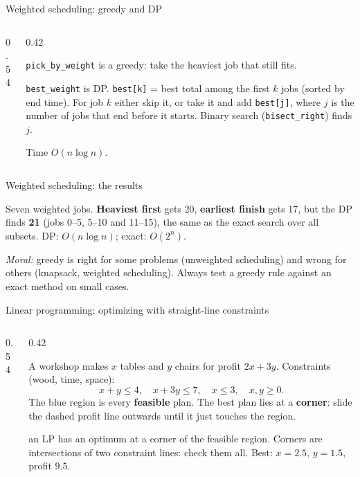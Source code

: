 \documentclass[aspectratio=169,10pt]{beamer}
\newcommand{\figtab}[2][0.5]{\begin{sfig}[#1]\end{sfig}}
\begin{document}
\begin{frame}{Weighted scheduling: greedy and DP}
\begin{columns}[T]
\begin{column}{0.54\textwidth}
\pycode[\fontsize{7.8}{9.2}\selectfont]{act_weight}
\vspace{2mm}
\pycode[\fontsize{7.8}{9.2}\selectfont]{act_dp}
\end{column}
\begin{column}{0.42\textwidth}
{\small
\texttt{pick\_by\_weight} is a greedy: take the heaviest job that still fits.

\vspace{2mm}
\texttt{best\_weight} is DP. \texttt{best[k]} = best total among the first $k$ jobs (sorted by end time). For job $k$ either skip it, or take it and add \texttt{best[j]}, where $j$ is the number of jobs that end before it starts. Binary search (\texttt{bisect\_right}) finds $j$.

\vspace{2mm}
Time $O(n\log n)$.}
\end{column}
\end{columns}
\end{frame}

\begin{frame}{Weighted scheduling: the results}
\vspace{2mm}
{\small
Seven weighted jobs. \textbf{Heaviest first} gets 20, \textbf{earliest finish} gets 17, but the DP finds \textbf{21} (jobs 0--5, 5--10 and 11--15), the same as the exact search over all subsets. DP: $O(n\log n)$; exact: $O(2^n)$.

\vspace{2mm}
\emph{Moral:} greedy is right for some problems (unweighted scheduling) and wrong for others (knapsack, weighted scheduling). Always test a greedy rule against an exact method on small cases.}
\end{frame}

\begin{frame}{Linear programming: optimizing with straight-line constraints}
\begin{columns}[T]
\begin{column}{0.54\textwidth}
\figtab[0.72]{fig_lp}
\end{column}
\begin{column}{0.42\textwidth}
{\small
A workshop makes $x$ tables and $y$ chairs for profit $2x+3y$. Constraints (wood, time, space):
\[x+y\le4,\quad x+3y\le7,\quad x\le3,\quad x,y\ge0.\]
The blue region is every \textbf{feasible} plan. The best plan lies at a \textbf{corner}: slide the dashed profit line outwards until it just touches the region.

\vspace{2mm}
 an LP has an optimum at a corner of the feasible region. Corners are intersections of two constraint lines: check them all. Best: $x=2.5$, $y=1.5$, profit $9.5$.}
\end{column}
\end{columns}
\end{frame}
\end{document}
